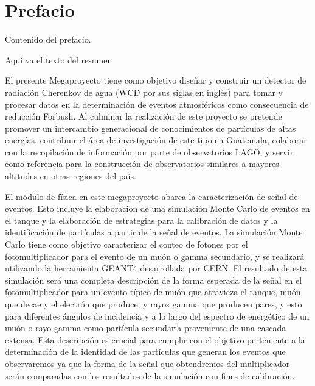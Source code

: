 \documentclass{book}
\begin{document}
\Ini


\chapter*{Prefacio}

Contenido del prefacio. 

\tableofcontents 

\Figura

\Cuadros


                  
Aqu\'i va el texto del resumen

\UnoA

El presente Megaproyecto tiene como objetivo dise\~nar y construir un detector de radiaci\'on Cherenkov de agua (WCD por sus siglas en ingl\'es) para tomar y procesar datos en la determinaci\'on de eventos atmosf\'ericos como consecuencia de reducci\'on Forbush. Al culminar la realizaci\'on de este proyecto se pretende promover un intercambio generacional de conocimientos de part\'iculas de altas energ\'ias, contribuir el \'area de investigaci\'on de este tipo en Guatemala, colaborar con la recopilaci\'on de informaci\'on por parte de observatorios LAGO, y servir como referencia para la construcci\'on de observatorios similares a mayores altitudes en otras regiones del pa\'is.

El m\'odulo de f\'isica en este megaproyecto abarca la caracterizaci\'on de se\~nal de eventos. Esto incluye la elaboraci\'on de una simulaci\'on Monte Carlo de eventos en el tanque y la elaboraci\'on de estrategias para la calibraci\'on de datos y la identificaci\'on de part\'iculas a partir de la se\~nal de eventos. La simulaci\'on Monte Carlo tiene como objetivo caracterizar el conteo de fotones por el fotomultiplicador para el evento de un mu\'on o gamma secundario, y se realizar\'a utilizando la herramienta GEANT4 desarrollada por CERN. El resultado de esta simulaci\'on ser\'a una completa descripci\'on de la forma esperada de la se\~nal en el fotomultiplicador para un evento t\'ipico de mu\'on que atravieza el tanque, mu\'on que decae y el electr\'on que produce, y rayos gamma que producen pares, y esto para diferentes \'angulos de incidencia y a lo largo del espectro de energ\'etico de un mu\'on o rayo gamma como part\'icula secundaria proveniente de una cascada extensa. Esta descripci\'on es crucial para cumplir con el objetivo perteniente a la determinaci\'on de la identidad de las part\'iculas que generan los eventos que observaremos ya que la forma de la se\~nal que obtendremos del multiplicador ser\'an comparadas con los resultados de la simulaci\'on con fines de calibraci\'on.
\end{document}
